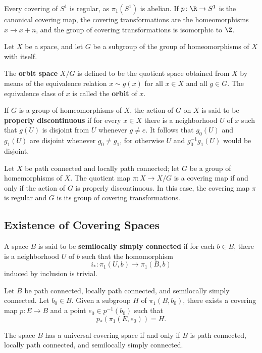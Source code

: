\begin{eg}
Every covering of $S^1$ is regular, as $\pi_1(S^1)$ is abelian. If $p \colon \R \rightarrow S^1$ is the canonical covering map, the covering transformations are the homeomorphisms $x \rightarrow x+n$, and the 
group of covering transformations is isomorphic to $\Z$.
\end{eg}

\begin{definition}
Let $X$ be a space, and let $G$ be a subgroup of the group of homeomorphisms of $X$ with itself. 

The \textbf{orbit space} $X/G$  is defined to be the quotient space obtained from $X$ by means of the equivalence relation $x \sim g(x)$ for all $x \in X$ and all $g \in G$.
The equivalence class of $x$ is called the \textbf{orbit} of $x$.
\end{definition}

\begin{definition}
If $G$ is a group of homeomorphisms of $X$, the action of $G$ on $X$ is said to be \textbf{properly discontinuous} if for every $x \in X$ there is a neighborhood $U$ of $x$ such that $g(U)$ is disjoint from $U$ whenever $g \neq e$. 
It follows that $g_0(U)$ and $g_1(U)$ are disjoint whenever $g_0 \neq g_1$, for otherwise $U$ and $g_0^{-1} g_1(U)$ would be disjoint.
\end{definition}

\begin{theorem*}[81.5]
Let $X$ be path connected and locally path connected; let $G$ be a group of homemorphisms of $X$. The quotient map $\pi\colon  X \rightarrow X/G$ is a covering map if and only if the action of $G$ is properly discontinuous.
In this case, the covering map $\pi$ is regular and $G$ is its group of covering transformations.
\end{theorem*}


\subsection{Existence of Covering Spaces}

\begin{definition}
A space $B$ is said to be \textbf{semilocally simply connected} if for each $b \in B$, there is a neighborhood $U$ of $b$ such that the homomorphism
\[
    i_{\ast} \colon \pi_1(U, b) \rightarrow \pi_1(B, b)
\]
induced by inclusion is trivial.
\end{definition}

\begin{theorem}
Let $B$ be path connected, locally path connected, and semilocally simply connected. Let $b_0 \in B$. Given a subgroup $H$ of $\pi_1(B, b_0)$, there exists a covering map $p\colon E \rightarrow B$
and a point $e_0 \in p^{-1}(b_0)$ such that
\[
    p_{\ast}(\pi_1(E, e_0)) = H.
\]
\end{theorem}

\begin{corollary}
The space $B$ has a universal covering space if and only if $B$ is path connected, locally path connected, and semilocally simply connected.
\end{corollary}